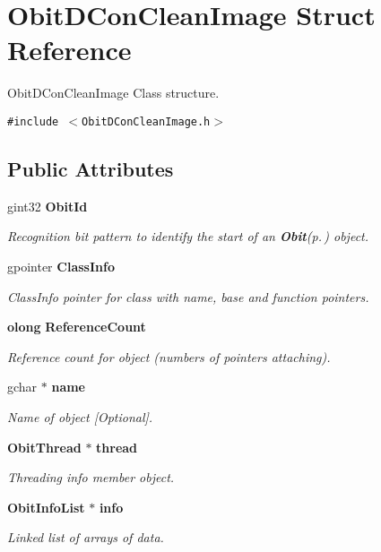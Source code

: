 \section{Obit\-DCon\-Clean\-Image Struct Reference}
\label{structObitDConCleanImage}
Obit\-DCon\-Clean\-Image Class structure.  


{\tt \#include $<$Obit\-DCon\-Clean\-Image.h$>$}

\subsection*{Public Attributes}
\begin{CompactItemize}
\item 
gint32 {\bf Obit\-Id}
\begin{CompactList}\small\item\em Recognition bit pattern to identify the start of an {\bf Obit}{\rm (p.\,\pageref{structObit})} object. \item\end{CompactList}\item 
gpointer {\bf Class\-Info}
\begin{CompactList}\small\item\em Class\-Info pointer for class with name, base and function pointers. \item\end{CompactList}\item 
{\bf olong} {\bf Reference\-Count}
\begin{CompactList}\small\item\em Reference count for object (numbers of pointers attaching). \item\end{CompactList}\item 
gchar $\ast$ {\bf name}
\begin{CompactList}\small\item\em Name of object [Optional]. \item\end{CompactList}\item 
{\bf Obit\-Thread} $\ast$ {\bf thread}
\begin{CompactList}\small\item\em Threading info member object. \item\end{CompactList}\item 
{\bf Obit\-Info\-List} $\ast$ {\bf info}
\begin{CompactList}\small\item\em Linked list of arrays of data. \item\end{CompactList}\item 

\end{CompactItemize}
